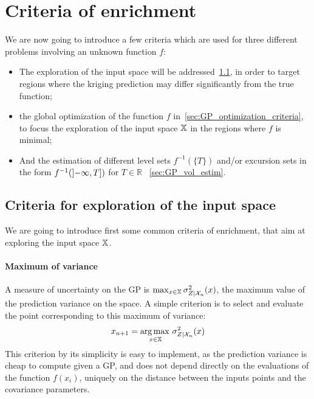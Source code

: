 \documentclass[../../Main_ManuscritThese.tex]{subfiles}
\begin{document}
\section{Criteria of enrichment}

We are now going to introduce a few criteria which are used for three different problems involving an unknown function $f$:
\begin{itemize}
\item The exploration of the input space will be addressed~\cref{sec:exploration_criteria}, in order to target regions where the kriging prediction may differ significantly from the true function;
\item the global optimization of the function $f$ in~\cref{sec:GP_optimization_criteria}, to focus the exploration of the input space $\mathbb{X}$ in the regions where $f$ is minimal;
\item And the estimation of different level sets $f^{-1}(\{T\})$ and/or excursion sets in the form $f^{-1}(\interval[open left]{-\infty}{T})$ for $T\in\mathbb{R}$ ~\cref{sec:GP_vol_estim}.
\end{itemize}

\subsection{Criteria for exploration of the input space}
\label{sec:exploration_criteria}
We are going to introduce first some common criteria of enrichment, that aim at exploring the input space $\mathbb{X}$.

\paragraph{Maximum of variance}
A measure of uncertainty on the GP is $\max_{x\in\mathbb{X}} \sigma_{Z \mid \mathcal{X}_n}^2(x)$, the maximum value of the prediction variance on the space.
A simple criterion is to select and evaluate the point corresponding to this maximum of variance:
\begin{equation}
  x_{n+1} = \operatorname*{arg\,max \,}_{x \in \mathbb{X}} \sigma^2_{Z \mid \mathcal{X}_n}(x)
\end{equation}
This criterion by its simplicity is easy to implement, as the prediction variance is cheap to compute given a GP, and does not depend directly on the evaluations of the function $f(x_i)$, uniquely on the distance between the inputs points and the covariance parameters.
\end{document}

